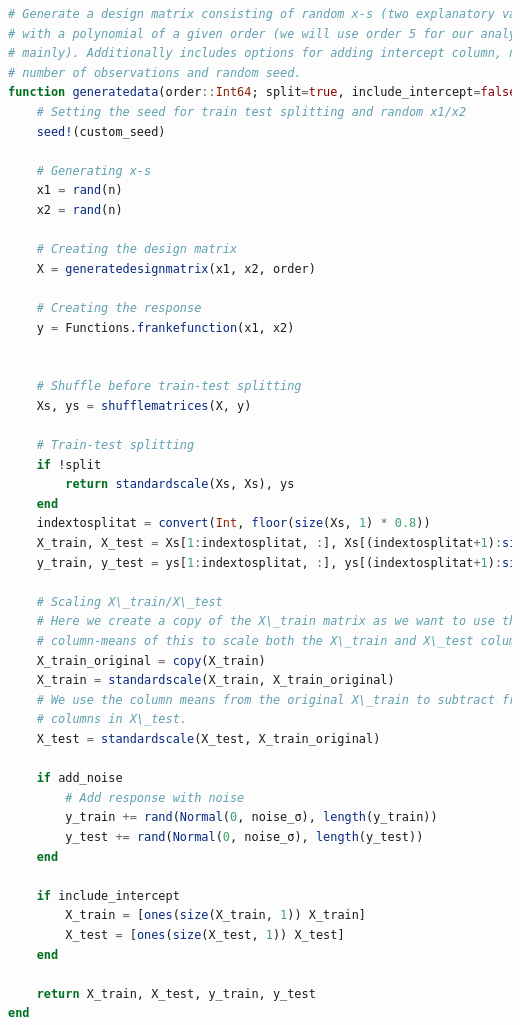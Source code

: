 \documentclass{article}
\begin{document}
\begin{lstlisting}[language=julia]
# Generate a design matrix consisting of random x-s (two explanatory variables)
# with a polynomial of a given order (we will use order 5 for our analysis
# mainly). Additionally includes options for adding intercept column, noise,
# number of observations and random seed.
function generatedata(order::Int64; split=true, include_intercept=false, add_noise=false, noise_σ=0.1, n=200, custom_seed=1000)
    # Setting the seed for train test splitting and random x1/x2
    seed!(custom_seed)

    # Generating x-s
    x1 = rand(n)
    x2 = rand(n)

    # Creating the design matrix
    X = generatedesignmatrix(x1, x2, order)

    # Creating the response
    y = Functions.frankefunction(x1, x2)


    # Shuffle before train-test splitting
    Xs, ys = shufflematrices(X, y)

    # Train-test splitting
    if !split
        return standardscale(Xs, Xs), ys
    end
    indextosplitat = convert(Int, floor(size(Xs, 1) * 0.8))
    X_train, X_test = Xs[1:indextosplitat, :], Xs[(indextosplitat+1):size(Xs, 1), :]
    y_train, y_test = ys[1:indextosplitat, :], ys[(indextosplitat+1):size(ys, 1), :]

    # Scaling X\_train/X\_test
    # Here we create a copy of the X\_train matrix as we want to use the
    # column-means of this to scale both the X\_train and X\_test columns.
    X_train_original = copy(X_train)
    X_train = standardscale(X_train, X_train_original)
    # We use the column means from the original X\_train to subtract from the
    # columns in X\_test.
    X_test = standardscale(X_test, X_train_original)

    if add_noise
        # Add response with noise
        y_train += rand(Normal(0, noise_σ), length(y_train))
        y_test += rand(Normal(0, noise_σ), length(y_test))
    end

    if include_intercept
        X_train = [ones(size(X_train, 1)) X_train]
        X_test = [ones(size(X_test, 1)) X_test]
    end

    return X_train, X_test, y_train, y_test
end
\end{lstlisting}
\end{document}
